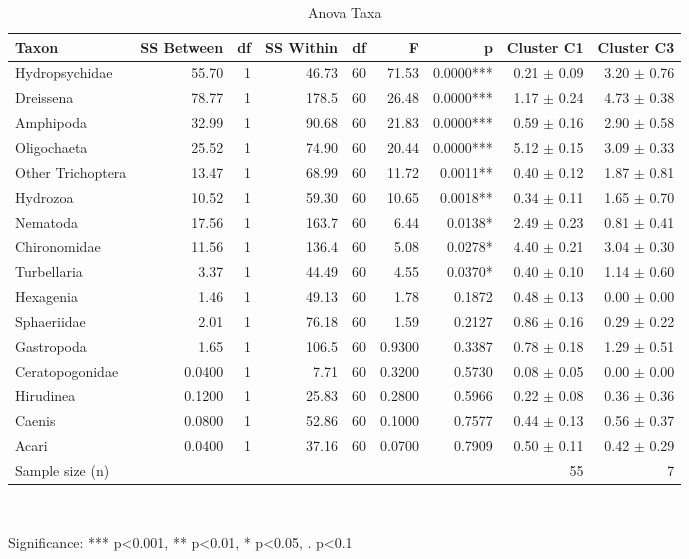 \begin{table}[htbp]
  \centering
  \caption{Anova Taxa}
  \label{tab:02_taxa_assemblage_reproduction_with_same_taxa_data_anova_taxa}
  \small
  \begin{tabular}{lrrrrrrrr}
    \toprule
    Taxon & SS Between & df & SS Within & df  & F & p & Cluster C1 & Cluster C3 \\
    \midrule
    Hydropsychidae & 55.70 & 1 & 46.73 & 60 & 71.53 & 0.0000*** & 0.21 $\pm$ 0.09 & 3.20 $\pm$ 0.76 \\
    Dreissena & 78.77 & 1 & 178.5 & 60 & 26.48 & 0.0000*** & 1.17 $\pm$ 0.24 & 4.73 $\pm$ 0.38 \\
    Amphipoda & 32.99 & 1 & 90.68 & 60 & 21.83 & 0.0000*** & 0.59 $\pm$ 0.16 & 2.90 $\pm$ 0.58 \\
    Oligochaeta & 25.52 & 1 & 74.90 & 60 & 20.44 & 0.0000*** & 5.12 $\pm$ 0.15 & 3.09 $\pm$ 0.33 \\
    Other Trichoptera & 13.47 & 1 & 68.99 & 60 & 11.72 & 0.0011** & 0.40 $\pm$ 0.12 & 1.87 $\pm$ 0.81 \\
    Hydrozoa & 10.52 & 1 & 59.30 & 60 & 10.65 & 0.0018** & 0.34 $\pm$ 0.11 & 1.65 $\pm$ 0.70 \\
    Nematoda & 17.56 & 1 & 163.7 & 60 & 6.44 & 0.0138* & 2.49 $\pm$ 0.23 & 0.81 $\pm$ 0.41 \\
    Chironomidae & 11.56 & 1 & 136.4 & 60 & 5.08 & 0.0278* & 4.40 $\pm$ 0.21 & 3.04 $\pm$ 0.30 \\
    Turbellaria & 3.37 & 1 & 44.49 & 60 & 4.55 & 0.0370* & 0.40 $\pm$ 0.10 & 1.14 $\pm$ 0.60 \\
    Hexagenia & 1.46 & 1 & 49.13 & 60 & 1.78 & 0.1872 & 0.48 $\pm$ 0.13 & 0.00 $\pm$ 0.00 \\
    Sphaeriidae & 2.01 & 1 & 76.18 & 60 & 1.59 & 0.2127 & 0.86 $\pm$ 0.16 & 0.29 $\pm$ 0.22 \\
    Gastropoda & 1.65 & 1 & 106.5 & 60 & 0.9300 & 0.3387 & 0.78 $\pm$ 0.18 & 1.29 $\pm$ 0.51 \\
    Ceratopogonidae & 0.0400 & 1 & 7.71 & 60 & 0.3200 & 0.5730 & 0.08 $\pm$ 0.05 & 0.00 $\pm$ 0.00 \\
    Hirudinea & 0.1200 & 1 & 25.83 & 60 & 0.2800 & 0.5966 & 0.22 $\pm$ 0.08 & 0.36 $\pm$ 0.36 \\
    Caenis & 0.0800 & 1 & 52.86 & 60 & 0.1000 & 0.7577 & 0.44 $\pm$ 0.13 & 0.56 $\pm$ 0.37 \\
    Acari & 0.0400 & 1 & 37.16 & 60 & 0.0700 & 0.7909 & 0.50 $\pm$ 0.11 & 0.42 $\pm$ 0.29 \\
    Sample size (n) &  &  &  &  &  &  & 55 & 7 \\
    \bottomrule
  \end{tabular}
  \\[4pt]
  \parbox{\textwidth}{\footnotesize Significance: *** p<0.001, ** p<0.01, * p<0.05, . p<0.1}
\end{table}

